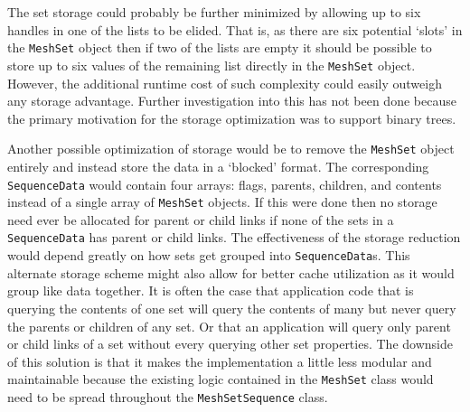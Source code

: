 \documentclass{report}
\begin{document}
The set storage could probably be further minimized by allowing up to six handles in one of the lists to be elided.  That is, as there are six potential `slots' in the \texttt{MeshSet} object then if two of the lists are empty it should be possible to store up to six values of the remaining list directly in the \texttt{MeshSet} object.  However, the additional runtime cost of such complexity could easily outweigh any storage advantage.  Further investigation into this has not been done because the primary motivation for the storage optimization was to support binary trees.

Another possible optimization of storage would be to remove the \texttt{MeshSet} object entirely and instead store the data in a `blocked' format.  The corresponding \texttt{SequenceData} would contain four arrays: flags, parents, children, and contents instead of a single array of \texttt{MeshSet} objects.  If this were done then no storage need ever be allocated for parent or child links if none of the sets in a \texttt{SequenceData} has parent or child links.  The effectiveness of the storage reduction would depend greatly on how sets get grouped into \texttt{SequenceData}s.  This alternate storage scheme might also allow for better cache utilization as it would group like data together.  It is often the case that application code that is querying the contents of one set will query the contents of many but never query the parents or children of any set.  Or that an application will query only parent or child links of a set without every querying other set properties.  The downside of this solution is that it makes the implementation a little less modular and maintainable because the existing logic contained in the \texttt{MeshSet} class would need to be spread throughout the \texttt{MeshSetSequence} class.
\end{document}
